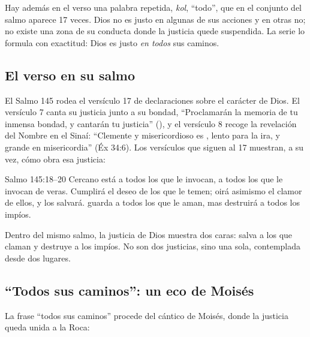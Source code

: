Hay además en el verso una palabra repetida,  \emph{kol}, ``todo'', que en el conjunto del salmo aparece 17 veces. Dios no es justo en algunas de sus acciones y en otras no; no existe una zona de su conducta donde la justicia quede suspendida. La serie lo formula con exactitud: Dios es justo \emph{en todos} sus caminos.


\subsection{El verso en su salmo}
El Salmo 145 rodea el versículo 17 de declaraciones sobre el carácter de Dios. El versículo 7 canta su justicia junto a su bondad, ``Proclamarán la memoria de tu inmensa bondad, y cantarán tu justicia'' (), y el versículo 8 recoge la revelación del Nombre en el Sinaí: ``Clemente y misericordioso es \SENOR, lento para la ira, y grande en misericordia'' (Éx 34:6). Los versículos que siguen al 17 muestran, a su vez, cómo obra esa justicia:

\begin{verso}{Salmo 145:18–20}
Cercano está \SENOR{} a todos los que le invocan, a todos los que le invocan de veras. Cumplirá el deseo de los que le temen; oirá asimismo el clamor de ellos, y los salvará. \SENOR{} guarda a todos los que le aman, mas destruirá a todos los impíos.
\end{verso}

Dentro del mismo salmo, la justicia de Dios muestra dos caras: salva a los que claman y destruye a los impíos. No son dos justicias, sino una sola, contemplada desde dos lugares.


\subsection{“Todos sus caminos”: un eco de Moisés}
La frase ``todos sus caminos'' procede del cántico de Moisés, donde la justicia queda unida a la Roca:


